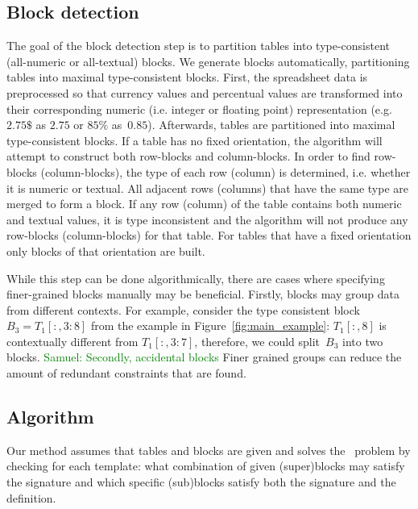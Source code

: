 \documentclass{IEEEtran}
\newcommand{\samuel}[1]{\textcolor{green}{{\sc Samuel:} #1}\xspace}
\newcommand{\range}[3]{\ensuremath{#1[#2,#3]}}
\newcommand{\rangeto}[2]{#1{:}#2}
\newcommand{\rangeall}{:}
\theoremstyle{definition}
\begin{document}
\subsection{Block detection} \label{sec:make_groups}
The goal of the block detection step is to partition tables into type-consistent (all-numeric or all-textual) blocks.
We generate blocks automatically, partitioning tables into maximal type-consistent blocks.
First, the spreadsheet data is preprocessed so that currency values and percentual values are transformed into their corresponding numeric (i.e. integer or floating point) representation (e.g. $2.75 \$$ as $2.75$ or $85\%$ as~$0.85$).
Afterwards, tables are partitioned into maximal type-consistent blocks.
If a table has no fixed orientation, the algorithm will attempt to construct both row-blocks and column-blocks.
In order to find row-blocks (column-blocks), the type of each row (column) is determined, i.e. whether it is numeric or textual.
All adjacent rows (columns) that have the same type are merged to form a block. 
If any row (column) of the table contains both numeric and textual values, it is type inconsistent and the algorithm will not produce any row-blocks (column-blocks) for that table.
For tables that have a fixed orientation only blocks of that orientation are built.

While this step can be done algorithmically, there are cases where specifying finer-grained blocks manually may be beneficial.
Firstly, blocks may group data from different contexts.
For example, consider the type consistent block $B_3=\range{T_1}{\rangeall}{\rangeto{3}{8}}$ from the example in Figure~\ref{fig:main_example}: $\range{T_1}{\rangeall}{8}$ is contextually different from $\range{T_1}{\rangeall}{\rangeto{3}{7}}$, therefore, we could split~$B_3$ into two blocks.
\samuel{Secondly, accidental blocks}
Finer grained groups can reduce the amount of redundant constraints that are found.

\newcommand{\temps}{\ensuremath{S}}

\subsection{Algorithm}
\label{sec:algo}
Our method assumes that tables and blocks are given and solves the \tcl~problem by checking for each template: what combination of given (super)blocks may satisfy the signature and which specific (sub)blocks satisfy both the signature and the definition.
\end{document}
